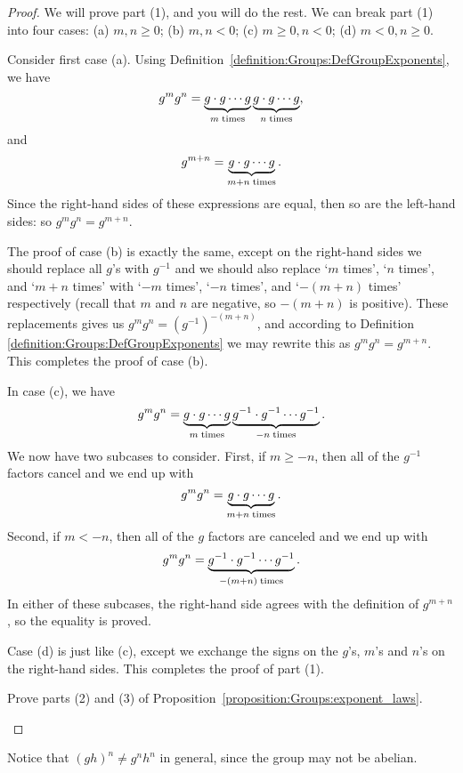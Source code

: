 \begin{proof}
We will prove part (1), and you will do the rest. We can break part (1) into four cases: (a) $m,n \ge 0$; (b) $m,n < 0$; 
(c) $m \ge 0, n< 0$; (d) $m<0, n \ge 0$. 

Consider first case (a). 
Using Definition~\ref{definition:Groups:DefGroupExponents}, we have
\[
g^m g^n = \underbrace{g \cdot g \cdots g}_{m \; {\rm times}}\underbrace{g \cdot g \cdots g}_{n \; {\rm times}},
\]
and
\[
g^{m+n} = \underbrace{g \cdot g \cdots g}_{m+n \; {\rm times}}.
\]
Since the right-hand sides of these expressions are equal, then so are the left-hand sides: so $g^mg^n = g^{m+n}$.

The proof of case (b) is exactly the same, except on the right-hand sides we should replace all $g$'s with $g^{-1}$ and we should also replace `$m$ times', `$n$ times', and `$m+n$ times' with `$-m$ times', `$-n$ times', and `$-(m+n)$ times' respectively (recall that $m$ and $n$ are negative, so $-(m+n)$ is positive). These replacements gives us
$g^mg^n =( g^{-1})^{-(m+n)}$, and according to Definition \ref{definition:Groups:DefGroupExponents} we may rewrite this as  $g^mg^n = g^{m+n}$. This completes the proof of case (b).

In case (c), we have
\[
g^m g^n = \underbrace{g \cdot g \cdots g}_{m \; {\rm times}}\underbrace{g^{-1} \cdot g^{-1} \cdots g^{-1}}_{-n \; {\rm times}}.
\]
We now have two subcases to consider. First, if $m \ge -n$, then all of the $g^{-1}$ factors cancel and we end up with
\[
g^m g^n = \underbrace{g \cdot g \cdots g}_{m+n \; {\rm times}}.
\]
Second, if $m < -n$, then all of the $g$ factors are canceled and we end up with
\[
g^m g^n = \underbrace{g^{-1} \cdot g^{-1} \cdots g^{-1}}_{-(m+n) \; {\rm times}}.
\]
In either of these subcases, the right-hand side agrees with the definition of $g^{m+n}$, so the equality is proved.

Case (d) is just like (c), except we exchange the signs  on the $g$'s,  $m$'s and $n$'s on the right-hand sides. This completes the proof of part (1).


\begin{exercise}{59}
Prove parts (2) and (3) of Proposition~\ref{proposition:Groups:exponent_laws}.
\end{exercise}
\end{proof} 

Notice that $(gh)^n \neq g^nh^n$ in general, since the group may not be abelian.

